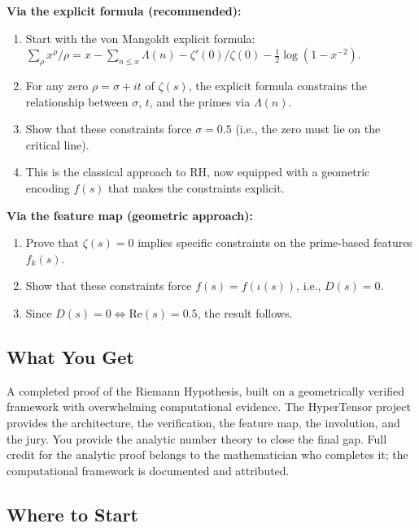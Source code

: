 \documentclass[11pt]{article}
\begin{document}
\textbf{Via the explicit formula (recommended):}
\begin{enumerate}[nosep]
\item Start with the von Mangoldt explicit formula: $\sum_\rho x^\rho/\rho = x - \sum_{n\le x} \Lambda(n) - \zeta'(0)/\zeta(0) - \frac12\log(1-x^{-2})$.
\item For any zero $\rho = \sigma + it$ of $\zeta(s)$, the explicit formula constrains the relationship between $\sigma$, $t$, and the primes via $\Lambda(n)$.
\item Show that these constraints force $\sigma = 0.5$ (i.e., the zero must lie on the critical line).
\item This is the classical approach to RH, now equipped with a geometric encoding $f(s)$ that makes the constraints explicit.
\end{enumerate}

\textbf{Via the feature map (geometric approach):}
\begin{enumerate}[nosep]
\item Prove that $\zeta(s) = 0$ implies specific constraints on the prime-based features $f_k(s)$.
\item Show that these constraints force $f(s) = f(\iota(s))$, i.e., $D(s) = 0$.
\item Since $D(s) = 0 \iff \mathrm{Re}(s) = 0.5$, the result follows.
\end{enumerate}

\subsection*{What You Get}

A completed proof of the Riemann Hypothesis, built on a geometrically verified framework with overwhelming computational evidence. The HyperTensor project provides the architecture, the verification, the feature map, the involution, and the jury. You provide the analytic number theory to close the final gap. Full credit for the analytic proof belongs to the mathematician who completes it; the computational framework is documented and attributed.

\subsection*{Where to Start}
\end{document}

